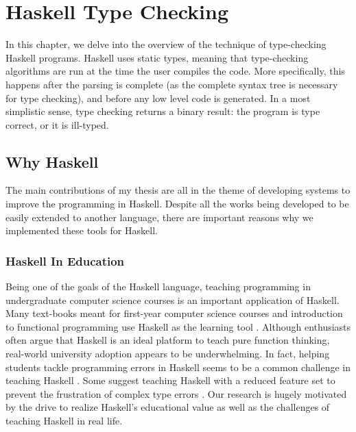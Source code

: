 
\chapter{Haskell Type Checking} %

\label{chap:haskell-type-checking}

\graphicspath{{Figures/HaskellTypeChecking}}
In this chapter, we delve into the overview of the technique of type-checking Haskell programs. Haskell uses static types, meaning that type-checking algorithms are run at the time the user compiles the code. More specifically, this happens after the parsing is complete (as the complete syntax tree is necessary for type checking), and before any low level code is generated. In a most simplistic sense, type checking returns a binary result: the program is type correct, or it is ill-typed.

\section{Why Haskell}

The main contributions of my thesis are all in the theme of developing systems to improve the programming in Haskell. Despite all the works being developed to be easily extended to another language, there are important reasons why we implemented these tools for Haskell.

\subsection{Haskell In Education}

Being one of the goals of the  Haskell language, teaching programming in undergraduate computer science courses is an important application of Haskell.  Many text-books meant for first-year computer science courses and introduction to functional programming use Haskell as the learning tool \cite{Bird1998-kv, Davie1992-xv}. Although enthusiasts often argue that Haskell is an ideal platform to teach pure function thinking, real-world university adoption appears to be underwhelming. In fact, helping students tackle programming errors in Haskell seems to be a common challenge in teaching Haskell \cite{Jun2000-yu, Tirronen2015-nr}. Some suggest teaching Haskell with a reduced feature set to prevent the frustration of complex type errors \cite{Heeren2003-mz}. Our research is hugely motivated by the drive to realize Haskell's educational value as well as the challenges of teaching Haskell in real life.

